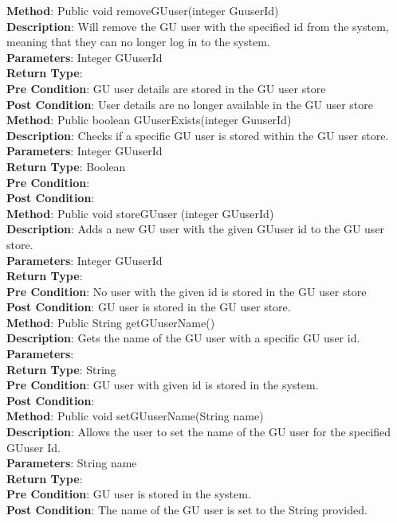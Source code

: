 \documentclass{l3deliverable}
\begin{document}
\textbf{Method}: Public void removeGUuser(integer GuuserId)\\
\textbf{Description}: Will remove the GU user with the specified id from the system, meaning that they can no longer log in to the system.
\\
\textbf{Parameters}: Integer GUuserId\\
\textbf{Return Type}:\\
\textbf{Pre Condition}: GU user details are stored in the GU user store\\
\textbf{Post Condition}: User details are no longer available in the GU user store\\

\textbf{Method}: Public boolean GUuserExists(integer GuuserId)\\
\textbf{Description}: Checks if a specific GU user is stored within the GU user store.\\
\textbf{Parameters}: Integer GUuserId\\
\textbf{Return Type}: Boolean\\
\textbf{Pre Condition}:\\
\textbf{Post Condition}:\\

\textbf{Method}: Public void storeGUuser (integer GUuserId)\\
\textbf{Description}: Adds a new GU user with the given GUuser id to the GU user store.\\
\textbf{Parameters}: Integer GUuserId\\
\textbf{Return Type}:\\
\textbf{Pre Condition}: No user with the given id is stored in the GU user store\\
\textbf{Post Condition}: GU user is stored in the GU user store.\\

\textbf{Method}: Public String getGUuserName()\\
\textbf{Description}: Gets the name of the GU user with a specific GU user id.\\
\textbf{Parameters}:\\
\textbf{Return Type}: String\\
\textbf{Pre Condition}: GU user with given id is stored in the system.\\
\textbf{Post Condition}:\\

\textbf{Method}: Public void setGUuserName(String name)\\
\textbf{Description}: Allows the user to set the name of the GU user for the specified GUuser Id.\\
\textbf{Parameters}: String name\\
\textbf{Return Type}:\\
\textbf{Pre Condition}: GU user is stored in the system.\\
\textbf{Post Condition}: The name of the GU user is set to the String provided.\\
\end{document}
